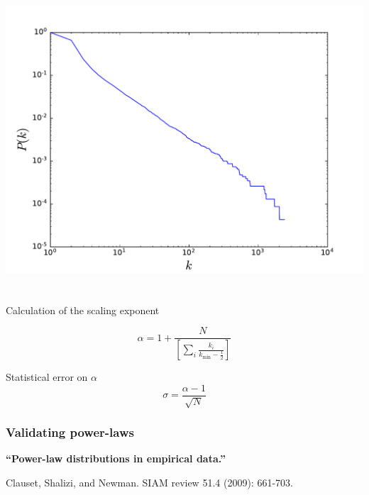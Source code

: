 \documentclass{beamer}
\begin{document}
\begin{frame}
\begin{columns}
        \includegraphics[width=\columnwidth]{internet_loglog_cum_hist2.pdf}
    \end{columns}
\end{frame}
\begin{frame}
    \frametitle{}
    Calculation of the scaling exponent
    
    \centering
    $$\alpha = 1 + \frac{N}{\left[\sum\limits_i\frac{k_i}{k_{\text{min}}-\frac{1}{2}}\right]}$$

    \justifying
    Statistical error on $\alpha$
    $$\sigma = \frac{\alpha-1}{\sqrt{N}}$$
\end{frame}
\begin{frame}
    \frametitle{Validating power-laws}
    \centering
    {\bf ``Power-law distributions in empirical data.''}

    {\small Clauset, Shalizi, and Newman.  SIAM review 51.4 (2009): 661-703.}
\end{frame}
\end{document}
